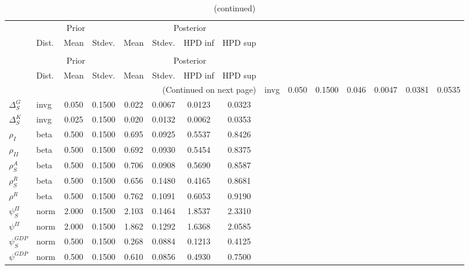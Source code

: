  
\begin{center}
\begin{longtable}{llcccccc} 
\caption{Results from Metropolis-Hastings (parameters)}
 \label{Table:MHPosterior:1}\\
\toprule 
  & \multicolumn{3}{c}{Prior}  &  \multicolumn{4}{c}{Posterior} \\
  \cmidrule(r{.75em}){2-4} \cmidrule(r{.75em}){5-8}
  & Dist. & Mean  & Stdev. & Mean & Stdev. & HPD inf & HPD sup\\
\midrule \endfirsthead 
\caption{(continued)}\\\toprule 
  & \multicolumn{3}{c}{Prior}  &  \multicolumn{4}{c}{Posterior} \\
  \cmidrule(r{.75em}){2-4} \cmidrule(r{.75em}){5-8}
  & Dist. & Mean  & Stdev. & Mean & Stdev. & HPD inf & HPD sup\\
\midrule \endhead 
\bottomrule \multicolumn{8}{r}{(Continued on next page)} \endfoot 
\bottomrule \endlastfoot 
${\Delta^{A}_{S}}$ & invg &   0.050 & 0.1500 &   0.046& 0.0047 &  0.0381 &  0.0535 \\ 
${\Delta^{G}_{S}}$ & invg &   0.050 & 0.1500 &   0.022& 0.0067 &  0.0123 &  0.0323 \\ 
${\Delta^{K}_{S}}$ & invg &   0.025 & 0.1500 &   0.020& 0.0132 &  0.0062 &  0.0353 \\ 
${\rho_{I}}$ & beta &   0.500 & 0.1500 &   0.695& 0.0925 &  0.5537 &  0.8426 \\ 
${\rho_{II}}$ & beta &   0.500 & 0.1500 &   0.692& 0.0930 &  0.5454 &  0.8375 \\ 
${\rho^{A}_{S}}$ & beta &   0.500 & 0.1500 &   0.706& 0.0908 &  0.5690 &  0.8587 \\ 
${\rho^{R}_{S}}$ & beta &   0.500 & 0.1500 &   0.656& 0.1480 &  0.4165 &  0.8681 \\ 
${\rho^{R}}$ & beta &   0.500 & 0.1500 &   0.762& 0.1091 &  0.6053 &  0.9190 \\ 
${\psi^{\Pi}_{S}}$ & norm &   2.000 & 0.1500 &   2.103& 0.1464 &  1.8537 &  2.3310 \\ 
${\psi^{\Pi}}$ & norm &   2.000 & 0.1500 &   1.862& 0.1292 &  1.6368 &  2.0585 \\ 
${\psi^{GDP}_{S}}$ & norm &   0.500 & 0.1500 &   0.268& 0.0884 &  0.1213 &  0.4125 \\ 
${\psi^{GDP}}$ & norm &   0.500 & 0.1500 &   0.610& 0.0856 &  0.4930 &  0.7500 \\ 
\end{longtable}
 \end{center}
